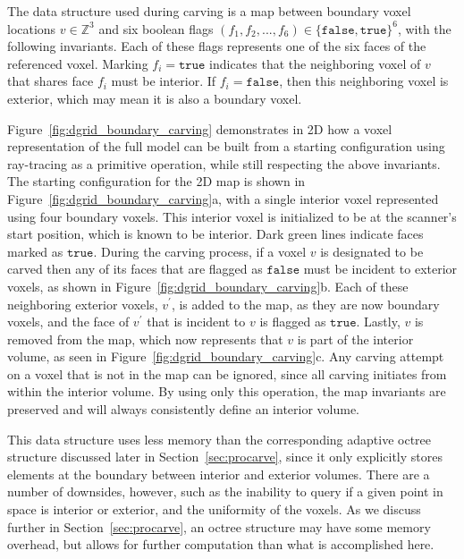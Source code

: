 \documentclass[12pt,onecolumn,oneside]{book}
\begin{document}
The data structure used during carving is a map between boundary voxel locations $v \in \mathbb{Z}^3$ and six boolean flags $(f_1,f_2,...,f_6) \in \{\texttt{false},\texttt{true}\}^6$, with the following invariants.  Each of these flags represents one of the six faces of the referenced voxel.  Marking $f_i = \texttt{true}$ indicates that the neighboring voxel of $v$ that shares face $f_i$ must be interior.  If $f_i = \texttt{false}$, then this neighboring voxel is exterior, which may mean it is also a boundary voxel.

Figure~\ref{fig:dgrid_boundary_carving} demonstrates in 2D how a voxel representation of the full model can be built from a starting configuration using ray-tracing as a primitive operation, while still respecting the above invariants.  The starting configuration for the 2D map is shown in Figure~\ref{fig:dgrid_boundary_carving}a, with a single interior voxel represented using four boundary voxels.  This interior voxel is initialized to be at the scanner's start position, which is known to be interior.  Dark green lines indicate faces marked as $\texttt{true}$.  During the carving process, if a voxel $v$ is designated to be carved then any of its faces that are flagged as $\texttt{false}$ must be incident to exterior voxels, as shown in Figure~\ref{fig:dgrid_boundary_carving}b.  Each of these neighboring exterior voxels, $v^{\prime}$, is added to the map, as they are now boundary voxels, and the face of $v^{\prime}$ that is incident to $v$ is flagged as $\texttt{true}$.  Lastly, $v$ is removed from the map, which now represents that $v$ is part of the interior volume, as seen in Figure~\ref{fig:dgrid_boundary_carving}c.  Any carving attempt on a voxel that is not in the map can be ignored, since all carving initiates from within the interior volume.  By using only this operation, the map invariants are preserved and will always consistently define an interior volume.

This data structure uses less memory than the corresponding adaptive octree structure discussed later in Section~\ref{sec:procarve}, since it only explicitly stores elements at the boundary between interior and exterior volumes.  There are a number of downsides, however, such as the inability to query if a given point in space is interior or exterior, and the uniformity of the voxels.  As we discuss further in Section~\ref{sec:procarve}, an octree structure may have some memory overhead, but allows for further computation than what is accomplished here.
\end{document}

